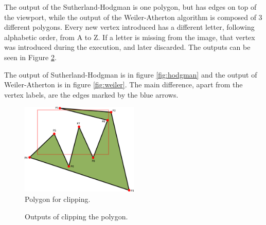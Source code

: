 \documentclass[12pt]{article}
\begin{document}
The output of the Sutherland-Hodgman is one polygon, but has edges on top of the viewport, 	while the output of the Weiler-Atherton algorithm is composed of 3 different polygons. Every new vertex introduced has a different letter, following alphabetic order, from A to Z. If a letter is missing from the image, that vertex was introduced during the execution, and later discarded. The outputs can be seen in Figure \ref{fig:outputs}.

The output of Sutherland-Hodgman is in figure \ref{fig:hodgman} and the output of Weiler-Atherton is in figure \ref{fig:weiler}. The main difference, apart from the vertex labels, are the edges marked by the blue arrows.

\begin{figure}
    \centering
    \includegraphics[width=0.5\textwidth]{images/poly.png}
    \caption{Polygon for clipping.}
    \label{fig:poly}
\end{figure}

\begin{figure}
    \centering
    \qquad
    \caption{Outputs of clipping the polygon.}
    \label{fig:outputs}
\end{figure}
\end{document}
